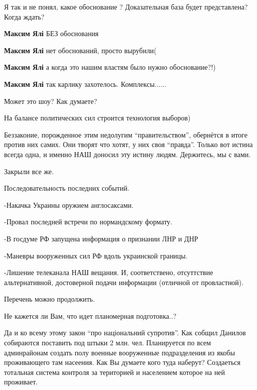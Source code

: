 \begin{itemize}

Я так и не понял, какое обоснование ? Доказательная база будет представлена?
Когда ждать?

\begin{itemize} %
\textbf{Максим Ялі} БЕЗ обоснования

\textbf{Максим Ялі} нет обоснований, просто вырубили(

\textbf{Максим Ялі} а когда это нашим властям было нужно обоснование?!)

\textbf{Максим Ялі} так карлику захотелось.
Комплексы......
\end{itemize} %

Может это шоу? Как думаете?

На балансе политических сил строится технология выборов)


Беззаконие, порожденное этим недолугим \enquote{правительством}, обернётся в итоге
против них самих. Они творят что хотят, у них своя \enquote{правда}. Только вот истина
всегда одна, и именно НАШ доносил эту истину людям. Держитесь, мы с вами.


Закрыли все же.

Последовательность последних событий.

-Накачка Украины оружием англосаксами.

-Провал последней встречи по нормандскому формату.

-В госдуме РФ запущена информация о признании ЛНР и ДНР

-Маневры вооруженных сил РФ вдоль украинской границы.

-Лишение телеканала НАШ вещания. И, соответствено, отсуттствие альтернативной,
достоверной подачи информации (отличной от провластной).

Перечень можно продолжить.

Не кажется ли Вам, что идет планомерная подготовка..?

Да и ко всему этому закон \enquote{про національний супротив}. Как собщил Данилов
собираются поставить под штыки 2 млн. чел. Планируется по всем админрайонам
создать полу военные вооруженные подразделения из якобы проживающего там
насеения. Как Вы думаете кого туда наберут? Создаеться тотальная система
контроля за територией и населением которое на ней проживает.


\end{itemize}
